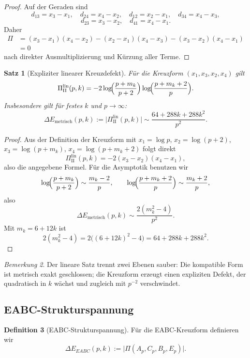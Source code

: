 \documentclass[11pt,a4paper]{article}
\newtheorem{satz}{Satz}
\theoremstyle{definition}
\newtheorem{definition}[satz]{Definition}
\theoremstyle{remark}
\newtheorem{bemerkung}[satz]{Bemerkung}
\begin{document}
\begin{proof}
Auf der Geraden sind
\[
d_{13}=x_3-x_1,\quad d_{24}=x_4-x_2,\quad d_{12}=x_2-x_1,\quad d_{34}=x_4-x_3,
\]
\[
d_{23}=x_3-x_2,\quad d_{41}=x_4-x_1.
\]
Daher
\begin{align*}
\Pi
&=(x_3-x_1)(x_4-x_2)-(x_2-x_1)(x_4-x_3)-(x_3-x_2)(x_4-x_1)\\
&=0
\end{align*}
nach direkter Ausmultiplizierung und Kürzung aller Terme.
\end{proof}

\begin{satz}[Expliziter linearer Kreuzdefekt]
Für die Kreuzform $(x_1,x_3,x_2,x_4)$ gilt
\[
\Pi_{\mathrm{II}}^{\mathrm{lin}}(p,k)
=
-2\log\!\Bigl(\frac{p+m_k}{p+2}\Bigr)\log\!\Bigl(\frac{p+m_k+2}{p}\Bigr).
\]
Insbesondere gilt für festes $k$ und $p\to\infty$:
\[
\Delta E_{\mathrm{metrisch}}(p,k):=
\bigl|\Pi_{\mathrm{II}}^{\mathrm{lin}}(p,k)\bigr|
\sim
\frac{64+288k+288k^2}{p^2}.
\]
\end{satz}

\begin{proof}
Aus der Definition der Kreuzform mit $x_1=\log p$, $x_2=\log(p+2)$, $x_3=\log(p+m_k)$, $x_4=\log(p+m_k+2)$ folgt direkt
\[
\Pi_{\mathrm{II}}^{\mathrm{lin}}(p,k)
=
-2(x_3-x_2)(x_4-x_1),
\]
also die angegebene Formel. Für die Asymptotik benutzen wir
\[
\log\!\Bigl(\frac{p+m_k}{p+2}\Bigr)\sim \frac{m_k-2}{p},
\qquad
\log\!\Bigl(\frac{p+m_k+2}{p}\Bigr)\sim \frac{m_k+2}{p},
\]
also
\[
\Delta E_{\mathrm{metrisch}}(p,k)\sim \frac{2(m_k^2-4)}{p^2}.
\]
Mit $m_k=6+12k$ ist
\[
2(m_k^2-4)=2\bigl((6+12k)^2-4\bigr)=64+288k+288k^2.
\]
\end{proof}

\begin{bemerkung}
Der lineare Satz trennt zwei Ebenen sauber: Die kompatible Form ist metrisch exakt geschlossen; die Kreuzform erzeugt einen expliziten Defekt, der quadratisch in $k$ wächst und zugleich mit $p^{-2}$ verschwindet.
\end{bemerkung}

\subsection{EABC-Strukturspannung}

\begin{definition}[EABC-Strukturspannung]
Für die EABC-Kreuzform definieren wir
\[
\Delta E_{EABC}(p,k):=
\bigl|\Pi(A_p,C_p,B_p,E_p)\bigr|.
\]
\end{definition}
\end{document}
